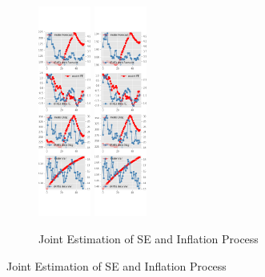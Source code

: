 \documentclass[]{article}
\begin{document}
\begin{figure}[htbp]
\begin{subfigure}[b]{\textwidth}
		\includegraphics[width=0.19\textwidth]{figures/sce_se_est_diag3.png}
		\includegraphics[width=0.19\textwidth]{figures/sce_se_est_diag4.png}
	\end{subfigure}
	\vspace{1em}
	\vfill
	\begin{subfigure}[b]{\textwidth}
		\centering
		\caption{Joint Estimation of SE and Inflation Process}
		\label{SE_diag_joint_SCE}

\end{subfigure}
\end{figure}
\end{document}
